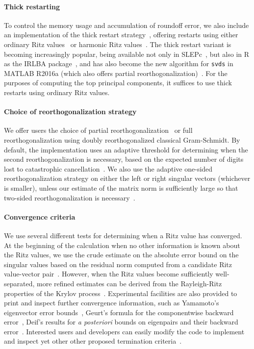 \documentclass[review]{siamart0516}
\begin{document}
\paragraph{Thick restarting}
To control the memory usage and accumulation of
roundoff error, we also include an implementation of the thick restart
strategy~\cite{Wu2000,Stewart2001}, offering restarts using either
ordinary Ritz values~\cite{Wu2000} or harmonic Ritz
values~\cite{Baglama2005}. The thick restart variant is becoming
increasingly popular, being available not only in
SLEPc~\cite{Hernandez2008}, but also in R as the IRLBA
package~\cite{cran-irlba}, and has also become the new algorithm for
\verb|svds| in \textsc{MATLAB} R2016a (which also offers partial
reorthogonalization)~\cite{matlab-r2016a}. For the purposes of computing
the top principal components, it suffices to use thick restarts using
ordinary Ritz values.

\paragraph{Choice of reorthogonalization strategy}
We offer users the choice of partial
reorthogonalization~\cite{Simon1984,Larsen1998} or full
reorthogonalization using doubly reorthogonalized classical Gram-Schmidt.
By default, the implementation uses an adaptive threshold for determining
when the second reorthogonalization is necessary, based on the expected
number of digits lost to catastrophic
cancellation~\cite{Daniel1976,Bjorck2015}.
We also use the adaptive one-sided reorthogonalization strategy on either
the left or right singular vectors (whichever is smaller), unless our
estimate of the matrix norm is sufficiently large so that two-sided
reorthogonalization is necessary~\cite{Simon2000}.

\paragraph{Convergence criteria}
We use several different tests for determining when a Ritz value has
converged. At the beginning of the calculation when no other information
is known about the Ritz values, we use the crude estimate on the absolute
error bound on the singular values based on the residual norm computed
from a candidate Ritz value-vector pair~\cite[Ch. 3, \S 53, p.
70]{Wilkinson1965}. However, when the Ritz values become sufficiently
well-separated, more refined estimates can be derived from the
Rayleigh-Ritz properties of the Krylov process~\cite[Ch. 3, \S 54-55, p.
73]{Wilkinson1965}\cite{Yamamoto1980,Ortega1990}.
Experimental facilities are also provided to print and inspect further
convergence information, such as Yamamoto's eigenvector error
bounds~\cite{Yamamoto1980}, Geurt's formula for the componentwise backward
error~\cite{Geurts1982}, Deif's results for \textit{a posteriori} bounds
on eigenpairs and their backward error~\cite{Deif1989}. Interested users
and developers can easily modify the code to implement and inspect yet
other other proposed termination criteria~\cite{Bennani1994}.
\end{document}
